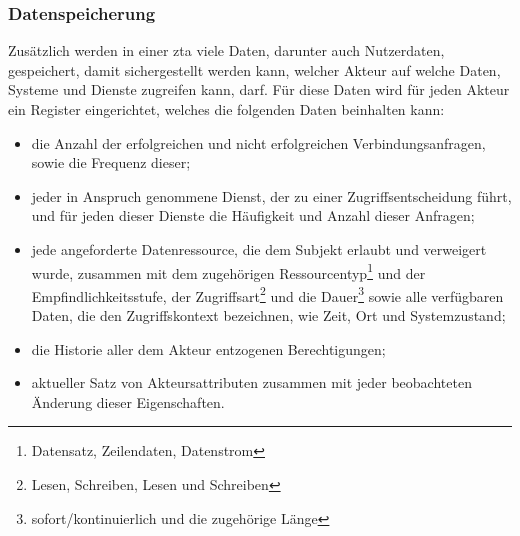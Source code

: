 \subsubsection{Datenspeicherung}\label{subsubsec:datenspeicherung}
Zusätzlich werden in einer \ac{zta} viele Daten, darunter auch Nutzerdaten, gespeichert, damit sichergestellt werden kann, welcher Akteur auf welche Daten, Systeme und Dienste zugreifen kann, \bzw darf.
Für diese Daten wird für jeden Akteur ein Register eingerichtet, welches die folgenden Daten beinhalten kann\autocite[\vglf][]{colombo-2021}:
\begin{itemize}
    \item die Anzahl der erfolgreichen und nicht erfolgreichen Verbindungsanfragen, sowie die Frequenz dieser;
    \item jeder in Anspruch genommene Dienst, der zu einer Zugriffsentscheidung führt, und für jeden dieser Dienste die Häufigkeit und Anzahl dieser Anfragen;
    \item jede angeforderte Datenressource, die dem Subjekt erlaubt und verweigert wurde, zusammen mit dem zugehörigen Ressourcentyp\footnote{\zb Datensatz, Zeilendaten, Datenstrom} und der Empfindlichkeitsstufe, der Zugriffsart\footnote{\zb Lesen, Schreiben, Lesen und Schreiben} und die Dauer\footnote{\zb sofort/kontinuierlich und die zugehörige Länge} sowie alle verfügbaren Daten, die den Zugriffskontext bezeichnen, wie \zb Zeit, Ort und Systemzustand;
    \item die Historie aller dem Akteur entzogenen Berechtigungen;
    \item aktueller Satz von Akteursattributen zusammen mit jeder beobachteten Änderung dieser Eigenschaften.
\end{itemize}

